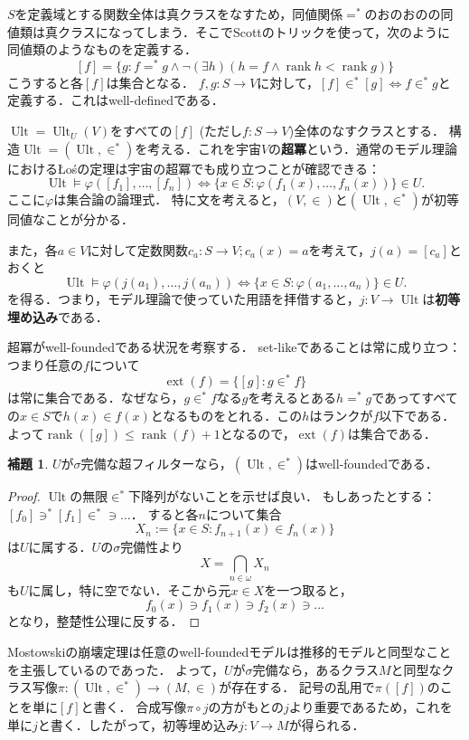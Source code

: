 \documentclass[uplatex]{jsarticle}
\newcommand{\rank}{\operatorname{rank}}
\newcommand{\Ult}{\operatorname{Ult}}
\newcommand{\ext}{\operatorname{ext}}
\theoremstyle{definition}
\newtheorem{lem}[thm]{補題}
\begin{document}
	$S$を定義域とする関数全体は真クラスをなすため，同値関係$=^*$のおのおのの同値類は真クラスになってしまう．そこでScottのトリックを使って，次のように同値類のようなものを定義する．
	\[
	[f] = 	\{ g : f =^* g \land \neg (\exists h)(h = f \land \rank h < \rank g) \}
	\]
	こうすると各$[f]$は集合となる．
	$f, g \colon S \to V$に対して，$[f] \in^* [g] \iff f \in^* g$と定義する．これはwell-definedである．
	
	$\Ult = \Ult_U(V)$をすべての$[f]$ (ただし$f \colon S \to V$)全体のなすクラスとする．
	構造$\Ult = (\Ult, \in^*)$を考える．これを宇宙$V$の\textbf{超冪}という．通常のモデル理論におけるŁośの定理は宇宙の超冪でも成り立つことが確認できる：
	\[
	\Ult \models \varphi([f_1], \dots, [f_n]) \iff \{ x \in S : \varphi(f_1(x), \dots, f_n(x)) \} \in U.
	\]
	ここに$\varphi$は集合論の論理式．
	特に文を考えると，$(V, \in)$と$(\Ult, \in^*)$が初等同値なことが分かる．
	
	また，各$a \in V$に対して定数関数$c_a \colon S \to V; c_a(x) = a$を考えて，$j(a) = [c_a]$とおくと
	\[
	\Ult \models \varphi(j(a_1), \dots, j(a_n)) \iff \{ x \in S : \varphi(a_1, \dots, a_n) \} \in U.
	\]
	を得る．つまり，モデル理論で使っていた用語を拝借すると，$j \colon V \to \Ult$は\textbf{初等埋め込み}である．

	超冪がwell-foundedである状況を考察する．
	set-likeであることは常に成り立つ：つまり任意の$f$について
	\[
	\ext(f) = \{ [g] : g \in^* f \}
	\]
	は常に集合である．なぜなら，$g \in^* f$なる$g$を考えるとある$h =^* g$であってすべての$x \in S$で$h(x) \in f(x)$となるものをとれる．この$h$はランクが$f$以下である．よって$\rank([g]) \le \rank(f) + 1$となるので，$\ext(f)$は集合である．
	
	\begin{lem}
		$U$が$\sigma$完備な超フィルターなら，$(\Ult, \in^*)$はwell-foundedである．	
	\end{lem}
	\begin{proof}
		$\Ult$の無限$\in^*$下降列がないことを示せば良い．
		もしあったとする：$[f_0] \ni^* [f_1] \in^* \ni \dots$．
		すると各$n$について集合
		\[
			X_n := \{ x \in S : f_{n+1}(x) \in f_n(x) \}
		\]
		は$U$に属する．$U$の$\sigma$完備性より
		\[
			X = \bigcap_{n \in \omega} X_n
		\]
		も$U$に属し，特に空でない．そこから元$x \in X$を一つ取ると，
		\[
		f_0(x) \ni f_1(x) \ni f_2(x) \ni \dots
		\]
		となり，整楚性公理に反する．
	\end{proof}
	
	Mostowskiの崩壊定理は任意のwell-foundedモデルは推移的モデルと同型なことを主張しているのであった．
	よって，$U$が$\sigma$完備なら，あるクラス$M$と同型なクラス写像$\pi \colon (\Ult, \in^*) \to (M, \in)$が存在する．
	記号の乱用で$\pi([f])$のことを単に$[f]$と書く．
	合成写像$\pi \circ j$の方がもとの$j$より重要であるため，これを単に$j$と書く．したがって，初等埋め込み$j \colon V \to M$が得られる．
	
\end{document}
